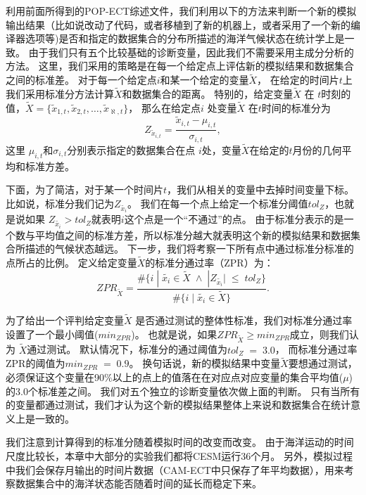 利用前面所得到的POP-ECT综述文件，我们利用以下的方法来判断一个新的模拟输出结果（比如说改动了代码，或者移植到了新的机器上，或者采用了一个新的编译器选项等)是否和指定的数据集合的分布所描述的海洋气候状态在统计学上是一致。 
由于我们只有五个比较基础的诊断变量，因此我们不需要采用主成分分析的方法。 
这里，我们采用的策略是在每一个给定点上评估新的模拟结果和数据集合之间的标准差。
对于每一个给定点$i$和某一个给定的变量$\tilde{{X}}$， 在给定的时间片$t$上我们采用标准分方法计算$\tilde{{X}}$和数据集合的距离。 
特别的，给定变量$\tilde{{X}}$ 在 $t$时刻的值，$\tilde{{X}} = \{ \tilde{x}_{1,t}, \tilde{x}_{2,t}, \dots, \tilde{x}_{\aleph,t}\}$， 那么在给定点$i$ 处变量$\tilde{{X}}$ 在$t$时间的标准分为
\begin{equation*}
Z_{\tilde{x}_{i,t}}=  \frac{\tilde{x}_{i,t} -\mu_{i,t}}{\sigma_{i,t}},
\end{equation*}
这里 $\mu_{i,t}$和$\sigma_{i,t}$分别表示指定的数据集合在点 $i$处，变量$\tilde{{X}}$在给定的$t$月份的几何平均和标准方差。  

 
下面，为了简洁，对于某一个时间片$t$，我们从相关的变量中去掉时间变量下标。比如说，标准分我们记为$Z_{\tilde{x_i}}$。 
我们在每一个点上给定一个标准分阈值$tol_{Z}$，也就是说如果 $Z_{\tilde{x_i}} > tol_{Z}$就表明$i$这个点是一个“不通过”的点。 
由于标准分表示的是一个数与平均值之间的标准方差，所以标准分越大就表明这个新的模拟结果和数据集合所描述的气候状态越远。 
下一步，我们将考察一下所有点中通过标准分标准的点所占的比例。 定义给定变量$\tilde{X}$的标准分通过率（ZPR）为：
\begin{equation}\label{e:zpr}
ZPR_{\tilde{X}} = \frac{ \#\{i \;|\; \tilde{x_i} \in \tilde{X} \; \land \; |Z_{\tilde{x_i}}| \; \leq \; tol_{Z}\} }{\#\{i \;|\; \tilde{x_i} \in \tilde{X} \} }.
\end{equation}
 
为了给出一个评判给定变量$\tilde{X}$ 是否通过测试的整体性标准，我们对标准分通过率设置了一个最小阈值($min_{ZPR}$)。 
也就是说，如果$ZPR_{\tilde{X}} \geq min_{ZPR}$成立，则我们认为 $\tilde{X}$通过测试。
默认情况下，标准分的通过阈值为$tol_{Z} \; = \; 3.0$， 而标准分通过率ZPR的阈值为$min_{ZPR} \; = \; 0.9$。 
换句话说，新的模拟结果中变量$\tilde{X}$要想通过测试，必须保证这个变量在90$\%$以上的点上的值落在在对应点对应变量的集合平均值($\mu$) 的$3.0$个标准差之间。
我们对五个独立的诊断变量依次做上面的判断。 
只有当所有的变量都通过测试，我们才认为这个新的模拟结果整体上来说和数据集合在统计意义上是一致的。


 
我们注意到计算得到的标准分随着模拟时间的改变而改变。 
由于海洋运动的时间尺度比较长，本章中大部分的实验我们都将CESM运行36个月。
另外，模拟过程中我们会保存月输出的时间片数据（CAM-ECT中只保存了年平均数据），用来考察数据集合中的海洋状态能否随着时间的延长而稳定下来。 



